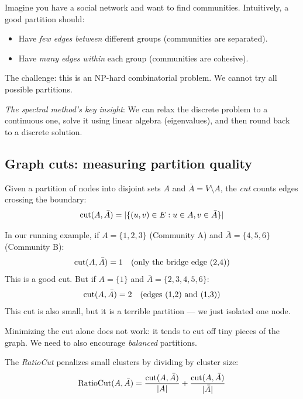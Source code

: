 \begin{notechapter}
\begin{intuition}
Imagine you have a social network and want to find communities. Intuitively, a good partition should:
\begin{itemize}
    \item Have \emph{few edges between} different groups (communities are separated).
    \item Have \emph{many edges within} each group (communities are cohesive).
\end{itemize}

The challenge: this is an NP-hard combinatorial problem. We cannot try all possible partitions.

\emph{The spectral method's key insight}: We can relax the discrete problem to a continuous one, solve it using linear algebra (eigenvalues), and then round back to a discrete solution.
\end{intuition}

\subsection{Graph cuts: measuring partition quality}

\begin{definition}\label{graph-laplacians:def:graph-cut}
Given a partition of nodes into disjoint sets $A$ and $\bar{A} = V \setminus A$, the \emph{cut} counts edges crossing the boundary:
\begin{equation}
\mathrm{cut}(A, \bar{A}) = |\{(u,v) \in E : u \in A, v \in \bar{A}\}|
\end{equation}
\end{definition}

\begin{example}
In our running example, if $A = \{1, 2, 3\}$ (Community A) and $\bar{A} = \{4, 5, 6\}$ (Community B):
\[
\mathrm{cut}(A, \bar{A}) = 1 \quad \text{(only the bridge edge (2,4))}
\]
This is a good cut. But if $A = \{1\}$ and $\bar{A} = \{2,3,4,5,6\}$:
\[
\mathrm{cut}(A, \bar{A}) = 2 \quad \text{(edges (1,2) and (1,3))}
\]
This cut is also small, but it is a terrible partition --- we just isolated one node.
\end{example}

\begin{keyidea}
Minimizing the cut alone does not work: it tends to cut off tiny pieces of the graph. We need to also encourage \emph{balanced} partitions.
\end{keyidea}

\begin{definition}\label{graph-laplacians:def:balanced-cuts}
The \emph{RatioCut} penalizes small clusters by dividing by cluster size:
\begin{equation}
\text{RatioCut}(A, \bar{A}) = \frac{\mathrm{cut}(A, \bar{A})}{|A|} + \frac{\mathrm{cut}(A, \bar{A})}{|\bar{A}|}
\end{equation}


\end{definition}
\end{notechapter}
